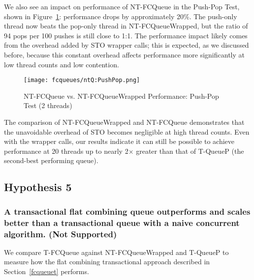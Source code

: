 We also see an impact on performance of NT-FCQueue in the Push-Pop Test, shown in Figure~\ref{fig:wrappedqs_pp}: performance drops by approximately 20\%. The push-only thread now beats the pop-only thread in NT-FCQueueWrapped, but the ratio of 94 pops per 100 pushes is still close to 1:1. The performance impact likely comes from the overhead added by STO wrapper calls; this is expected, as we discussed before, because this constant overhead affects performance more significantly at low thread counts and low contention.

\begin{figure}[t!]
    \centering
	\begin{minipage}{\textwidth}
        {\texttt{[image: fcqueues/ntQ:PushPop.png]}}
	\end{minipage}
    \caption{NT-FCQueue vs. NT-FCQueueWrapped Performance: Push-Pop Test (2 threads)}
    \label{fig:wrappedqs_pp}
\end{figure}


The comparison of NT-FCQueueWrapped and NT-FCQueue demonstrates that the unavoidable overhead of STO becomes negligible at high thread counts. Even with the wrapper calls, our results indicate it can still be possible to achieve performance at 20 threads up to nearly 2$\times$ greater than that of T-QueueP (the second-best performing queue).

\vspace{12pt}
\noindent{}

\subsection{Hypothesis 5}
\subsubsection{A transactional flat combining queue outperforms and scales better than a transactional queue with a naive concurrent algorithm. (Not Supported)}
\label{eval:hypo5}

We compare T-FCQueue against NT-FCQueueWrapped and T-QueueP to measure how the flat combining transactional approach described in Section~\ref{fcqueuet} performs.

